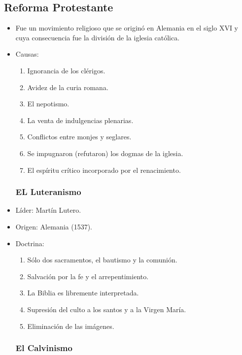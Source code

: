 \subsection{Reforma Protestante}

\begin{itemize}

\item Fue un movimiento religioso que se originó en Alemania en el siglo XVI y cuya consecuencia fue la división de la iglesia católica.

\item Causas:
\begin{enumerate}
	\item Ignorancia de los clérigos.
	\item Avidez de la curia romana.
	\item El nepotismo.
	\item La venta de indulgencias plenarias.
	\item Conflictos entre monjes y seglares.
	\item Se impugnaron (refutaron) los dogmas de la iglesia.
	\item El espíritu crítico  incorporado por el renacimiento.
\end{enumerate}

\subsubsection{EL Luteranismo}

\item Líder: Martín Lutero.
\item Origen: Alemania (1537).

\item Doctrina:
\begin{enumerate}
	\item Sólo dos sacramentos, el bautismo y la comunión.
	\item Salvación por la fe y el arrepentimiento.
	\item La Biblia es libremente interpretada.
	\item Supresión del culto a los santos y a la Virgen María.
	\item Eliminación de las imágenes.
\end{enumerate}

\subsubsection{El Calvinismo}


\end{itemize}

